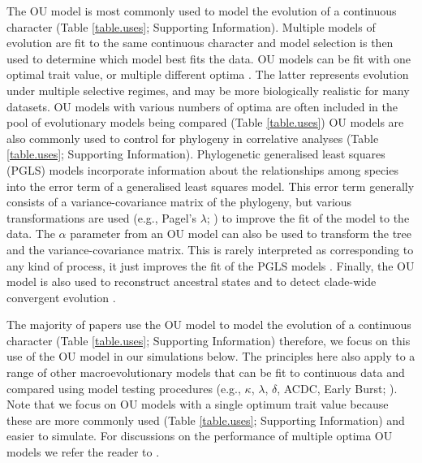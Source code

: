\documentclass[a4paper,12pt]{article}
\begin{document}
  The OU model is most commonly used to model the evolution of a continuous character (Table \ref{table.uses}; Supporting Information). 
  Multiple models of evolution \citep[e.g., Brownian motion, OU, Early burst etc.;][]{Harmon:2010aa,cooper2010body} are fit to the same continuous character and model selection is then used to determine which model best fits the data.  
  OU models can be fit with one optimal trait value, or multiple different optima \citep{Butler:2004aa,beaulieu2012modeling}. 
  The latter represents evolution under multiple selective regimes, and may be more biologically realistic for many datasets. 
  OU models with various numbers of optima are often included in the pool of evolutionary models being compared \citep[e.g.,][]{} (Table \ref{table.uses})
  OU models are also commonly used to control for phylogeny in correlative analyses (Table \ref{table.uses}; Supporting Information).  
  Phylogenetic generalised least squares (PGLS) models incorporate information about the relationships among species into the error term of a generalised least squares model. 
  This error term generally consists of a variance-covariance matrix of the phylogeny, but various transformations are used (e.g., Pagel's $\lambda$; \citealp{Pagel:1997aa}) to improve the fit of the model to the data. 
  The $\alpha$ parameter from an OU model can also be used to transform the tree and the variance-covariance matrix.
  This is rarely interpreted as corresponding to any kind of process, it just improves the fit of the PGLS models \citep[e.g.,][]{blankers2012ecological}. 
  Finally, the OU model is also used to reconstruct ancestral states \citep{martins1999estimation} and to detect clade-wide convergent evolution \citep{ingram2013surface}. 

  The majority of papers use the OU model to model the evolution of a continuous character (Table \ref{table.uses}; Supporting Information) therefore, we focus on this use of the OU model in our simulations below. 
  The principles here also apply to a range of other macroevolutionary models that can be fit to continuous data and compared using model testing procedures (e.g., $\kappa$, $\lambda$, $\delta$, ACDC, Early Burst; \citealp{Pagel:1997aa,Pagel:1999aa,Blomberg:2003aa,Harmon:2008aa}).
  Note that we focus on OU models with a single optimum trait value because these are more commonly used (Table \ref{table.uses}; Supporting Information) and easier to simulate.  For discussions on the performance of multiple optima OU models we refer the reader to \citep{beaulieu2012ouwie}.
\end{document}
